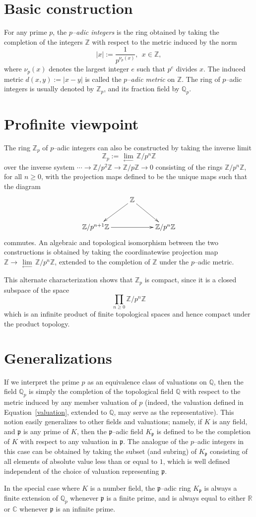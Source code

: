 \documentclass[12pt]{article}
\newcommand{\ilim}{\,\underset{\longleftarrow}{\lim}\,}
\newcommand{\Z}{\mathbb{Z}}
\newcommand{\Q}{\mathbb{Q}}
\newcommand{\p}{\mathfrak{p}}
\begin{document}
\section{Basic construction}

For any prime $p$, the {\em $p$--adic integers} is the ring obtained by taking the completion of the integers $\Z$ with respect to the metric induced by the norm
\begin{equation}\label{valuation}
|x| := \frac{1}{p^{\nu_p(x)}},\ \ x \in \Z,
\end{equation}
where $\nu_p(x)$ denotes the largest integer $e$ such that $p^e$ divides $x$. The induced metric $d(x,y) := |x-y|$ is called the {\em $p$--adic metric} on $\Z$. The ring of $p$--adic integers is usually denoted by $\Z_p$, and its fraction field by $\Q_p$.

\section{Profinite viewpoint}

The ring $\Z_p$ of $p$--adic integers can also be constructed by taking the inverse limit
$$
\Z_p := \ilim \Z/p^n\Z
$$
over the inverse system $\cdots \to \Z/p^2\Z \to \Z/p\Z \to 0$ consisting of the rings $\Z/p^n\Z$, for all $n \geq 0$, with the projection maps defined to be the unique maps such that the diagram
$$
\xymatrix{
& \Z \ar[dl] \ar[dr]\\
\Z/p^{n+1}\Z \ar[rr] & & \Z/p^n\Z
}
$$
commutes. An algebraic and topological isomorphism between the two constructions is obtained by taking the coordinatewise projection map $\Z \to \ilim \Z/p^n\Z$, extended to the completion of $\Z$ under the $p$--adic metric.

This alternate characterization shows that $\Z_p$ is compact, since it is a closed subspace of the space
$$
\prod_{n \geq 0} \Z/p^n\Z
$$
which is an infinite product of finite topological spaces and hence compact under the product topology.

\section{Generalizations}

If we interpret the prime $p$ as an equivalence class of valuations on $\Q$, then the field $\Q_p$ is simply the completion of the topological field $\Q$ with respect to the metric induced by any member valuation of $p$ (indeed, the valuation defined in Equation~\eqref{valuation}, extended to $\Q$, may serve as the representative). This notion easily generalizes to other fields and valuations; namely, if $K$ is any field, and $\p$ is any prime of $K$, then the $\p$--adic field $K_\p$ is defined to be the completion of $K$ with respect to any valuation in $\p$. The analogue of the $p$--adic integers in this case can be obtained by taking the subset (and subring) of $K_\p$ consisting of all elements of absolute value less than or equal to $1$, which is well defined independent of the choice of valuation representing $\p$.

In the special case where $K$ is a number field, the $\p$--adic ring $K_\p$ is always a finite extension of $\Q_p$ whenever $\p$ is a finite prime, and is always equal to either $\mathbb{R}$ or $\mathbb{C}$ whenever $\p$ is an infinite prime.
\end{document}
